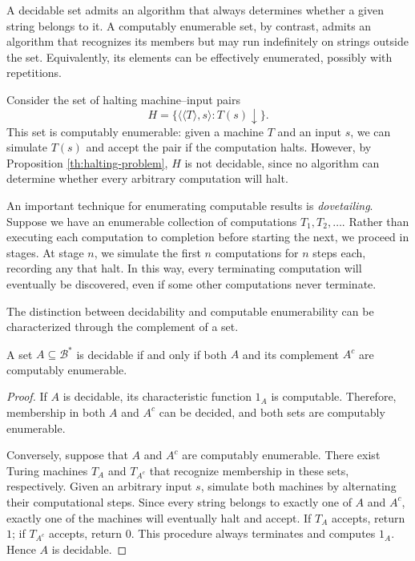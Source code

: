 A decidable set admits an algorithm that always determines whether a given string belongs to it. A computably enumerable set, by contrast, admits an algorithm that recognizes its members but may run indefinitely on strings outside the set. Equivalently, its elements can be effectively enumerated, possibly with repetitions.

\begin{example}
Consider the set of halting machine--input pairs
\[
H=\{\langle\langle T\rangle,s\rangle:T(s)\downarrow\}.
\]
This set is computably enumerable: given a machine $T$ and an input $s$, we can simulate $T(s)$ and accept the pair if the computation halts. However, by Proposition \ref{th:halting-problem}, $H$ is not decidable, since no algorithm can determine whether every arbitrary computation will halt.
\end{example}

An important technique for enumerating computable results is \emph{dovetailing}. Suppose we have an enumerable collection of computations $T_1,T_2,\ldots$. Rather than executing each computation to completion before starting the next, we proceed in stages. At stage $n$, we simulate the first $n$ computations for $n$ steps each, recording any that halt. In this way, every terminating computation will eventually be discovered, even if some other computations never terminate.

The distinction between decidability and computable enumerability can be characterized through the complement of a set.

\begin{proposition}
A set $A\subseteq\mathcal{B}^\ast$ is decidable if and only if both $A$ and its complement $A^c$ are computably enumerable.
\end{proposition}

\begin{proof}
If $A$ is decidable, its characteristic function $1_A$ is computable. Therefore, membership in both $A$ and $A^c$ can be decided, and both sets are computably enumerable.

Conversely, suppose that $A$ and $A^c$ are computably enumerable. There exist Turing machines $T_A$ and $T_{A^c}$ that recognize membership in these sets, respectively. Given an arbitrary input $s$, simulate both machines by alternating their computational steps. Since every string belongs to exactly one of $A$ and $A^c$, exactly one of the machines will eventually halt and accept. If $T_A$ accepts, return $1$; if $T_{A^c}$ accepts, return $0$. This procedure always terminates and computes $1_A$. Hence $A$ is decidable.
\end{proof}

